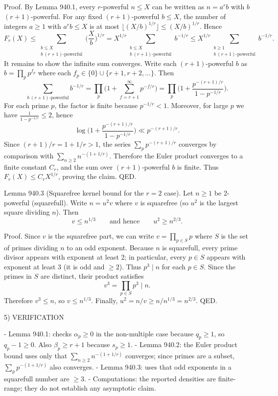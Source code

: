 Proof.
By Lemma 940.1, every \(r\)-powerful \(n\le X\) can be written as \(n=a^r b\) with \(b\) \((r+1)\)-powerful.
For any fixed \((r+1)\)-powerful \(b\le X\), the number of integers \(a\ge 1\) with \(a^r b\le X\) is at most \(\lfloor (X/b)^{1/r}\rfloor\le (X/b)^{1/r}\). Hence
\[F_r(X) \le \sum_{\substack{b\le X\\ b\ \text{$(r+1)$-powerful}}} \Big(\frac{X}{b}\Big)^{1/r}
= X^{1/r} \sum_{\substack{b\le X\\ b\ \text{$(r+1)$-powerful}}} b^{-1/r}
\le X^{1/r} \sum_{\substack{b\ge 1\\ b\ \text{$(r+1)$-powerful}}} b^{-1/r}.
\]
It remains to show the infinite sum converges. Write each \((r+1)\)-powerful \(b\) as \(b=\prod_p p^{f_p}\) where each \(f_p\in\{0\}\cup\{r+1,r+2,\dots\}\). Then
\[\sum_{b\ \text{$(r+1)$-powerful}} b^{-1/r}
= \prod_{p}\Big(1+\sum_{f=r+1}^{\infty} p^{-f/r}\Big)
= \prod_{p}\Big(1+\frac{p^{-(r+1)/r}}{1-p^{-1/r}}\Big).
\]
For each prime \(p\), the factor is finite because \(p^{-1/r}<1\).
Moreover, for large \(p\) we have \(\frac{1}{1-p^{-1/r}}\le 2\), hence
\[\log\Big(1+\frac{p^{-(r+1)/r}}{1-p^{-1/r}}\Big) \ll p^{-(r+1)/r}.
\]
Since \((r+1)/r=1+1/r>1\), the series \(\sum_{p} p^{-(r+1)/r}\) converges by comparison with \(\sum_{n\ge 2} n^{-(1+1/r)}\). Therefore the Euler product converges to a finite constant \(C_r\), and the sum over \((r+1)\)-powerful \(b\) is finite.
Thus \(F_r(X)\le C_r X^{1/r}\), proving the claim. QED.

Lemma 940.3 (Squarefree kernel bound for the \(r=2\) case).
Let \(n\ge 1\) be 2-powerful (squarefull). Write \(n=u^2 v\) where \(v\) is squarefree (so \(u^2\) is the largest square dividing \(n\)). Then
\[v\le n^{1/3}\qquad\text{and hence}\qquad u^2\ge n^{2/3}.
\]

Proof.
Since \(v\) is the squarefree part, we can write \(v=\prod_{p\in S} p\) where \(S\) is the set of primes dividing \(n\) to an odd exponent.
Because \(n\) is squarefull, every prime divisor appears with exponent at least 2; in particular, every \(p\in S\) appears with exponent at least 3 (it is odd and \(\ge2\)). Thus \(p^3\mid n\) for each \(p\in S\). Since the primes in \(S\) are distinct, their product satisfies
\[v^3=\prod_{p\in S} p^3 \mid n.
\]
Therefore \(v^3\le n\), so \(v\le n^{1/3}\). Finally, \(u^2=n/v\ge n/n^{1/3}=n^{2/3}\). QED.

5) VERIFICATION

- Lemma 940.1: checks \(\alpha_p\ge0\) in the non-multiple case because \(q_p\ge1\), so \(q_p-1\ge0\). Also \(\beta_p\ge r+1\) because \(s_p\ge1\).
- Lemma 940.2: the Euler product bound uses only that \(\sum_{n\ge2} n^{-(1+1/r)}\) converges; since primes are a subset, \(\sum_p p^{-(1+1/r)}\) also converges.
- Lemma 940.3: uses that odd exponents in a squarefull number are \(\ge3\).
- Computations: the reported densities are finite-range; they do not establish any asymptotic claim.

